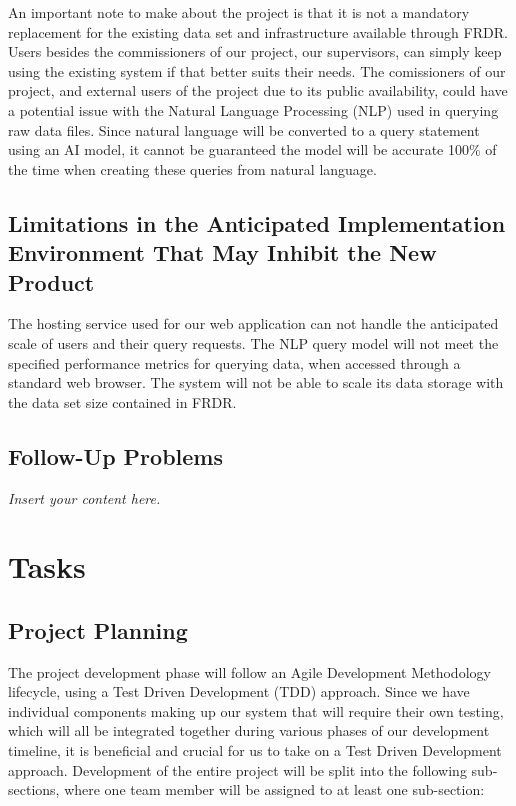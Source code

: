 \documentclass[12pt]{article}
\newcommand{\lips}{\textit{Insert your content here.}}
\begin{document}
\par{An important note to make about the project is that it is not a mandatory replacement for the existing data set and infrastructure 
available through FRDR. Users besides the commissioners of our project, our supervisors, can simply keep using the existing system 
if that better suits their needs. \newline \indent The comissioners of our project, and external users of the project due to its public 
availability, could have a potential issue with the Natural Language Processing (NLP) used in querying raw data files. Since natural language 
will be converted to a query statement using an AI model, it cannot be guaranteed the model will be accurate 100\% of the time when 
creating these queries from natural language.}

\subsection{Limitations in the Anticipated Implementation Environment That May
Inhibit the New Product}

\par{The hosting service used for our web application can not handle the anticipated scale of users and their query requests. \newline \indent
The NLP query model will not meet the specified performance metrics for querying data, when accessed through a standard web browser. \newline \indent
The system will not be able to scale its data storage with the data set size contained in FRDR.}

\subsection{Follow-Up Problems}
\lips

\section{Tasks}
\subsection{Project Planning}

\par{The project development phase will follow an Agile Development Methodology lifecycle, using a Test Driven Development (TDD) approach. 
Since we have individual components making up our system that will require their own testing, which will all be integrated together 
during various phases of our development timeline, it is beneficial and crucial for us to take on a Test Driven Development approach. \newline \indent 
Development of the entire project will be split into the following sub-sections, where one team member will be assigned to at least one 
sub-section:}
\end{document}
